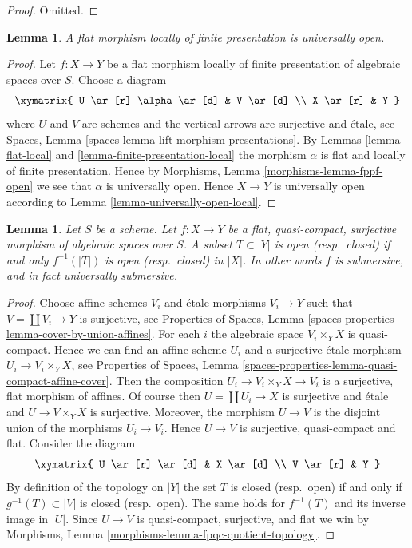 \documentclass{stacks-project}
\theoremstyle{plain}
\newtheorem{lemma}[subsection]{Lemma}
\theoremstyle{definition}
\theoremstyle{remark}
\numberwithin{equation}{subsection}
\begin{document}
\begin{proof}
Omitted.
\end{proof}

\begin{lemma}
\label{lemma-fppf-open}
A flat morphism locally of finite presentation is universally open.
\end{lemma}

\begin{proof}
Let $f : X \to Y$ be a flat morphism locally of finite presentation
of algebraic spaces over $S$. Choose a diagram
$$
\xymatrix{
U \ar[r]_\alpha \ar[d] & V \ar[d] \\
X \ar[r] & Y
}
$$
where $U$ and $V$ are schemes and the vertical arrows are surjective and
\'etale, see
Spaces, Lemma \ref{spaces-lemma-lift-morphism-presentations}.
By
Lemmas \ref{lemma-flat-local} and \ref{lemma-finite-presentation-local}
the morphism $\alpha$ is flat and locally of finite presentation.
Hence by
Morphisms, Lemma \ref{morphisms-lemma-fppf-open}
we see that $\alpha$ is universally open.
Hence $X \to Y$ is universally open according to
Lemma \ref{lemma-universally-open-local}.
\end{proof}

\begin{lemma}
\label{lemma-fpqc-quotient-topology}
Let $S$ be a scheme.
Let $f : X \to Y$ be a flat, quasi-compact, surjective morphism of
algebraic spaces over $S$.
A subset $T \subset |Y|$ is open (resp.\ closed) if and only
$f^{-1}(|T|)$ is open (resp.\ closed) in $|X|$.
In other words $f$ is submersive, and in fact universally submersive.
\end{lemma}

\begin{proof}
Choose affine schemes $V_i$ and \'etale morphisms $V_i \to Y$ such that
$V = \coprod V_i \to Y$ is surjective, see
Properties of Spaces,
Lemma \ref{spaces-properties-lemma-cover-by-union-affines}.
For each $i$ the algebraic space $V_i \times_Y X$ is quasi-compact.
Hence we can find an affine scheme $U_i$ and a surjective \'etale morphism
$U_i \to V_i \times_Y X$, see
Properties of Spaces,
Lemma \ref{spaces-properties-lemma-quasi-compact-affine-cover}.
Then the composition $U_i \to V_i \times_Y X \to V_i$ is a surjective,
flat morphism of affines.
Of course then $U = \coprod U_i \to X$ is surjective and \'etale
and $U \to V \times_Y X$ is surjective. Moreover, the morphism $U \to V$ is the
disjoint union of the morphisms $U_i \to V_i$. Hence $U \to V$ is surjective,
quasi-compact and flat. Consider the diagram
$$
\xymatrix{
U \ar[r] \ar[d] & X \ar[d] \\
V \ar[r] & Y
}
$$
By definition of the topology on $|Y|$ the set $T$ is closed
(resp.\ open) if and only if $g^{-1}(T) \subset |V|$ is closed
(resp.\ open). The same holds for
$f^{-1}(T)$ and its inverse image in $|U|$.
Since $U \to V$ is quasi-compact, surjective,  and flat we win by
Morphisms, Lemma \ref{morphisms-lemma-fpqc-quotient-topology}.
\end{proof}
\end{document}
